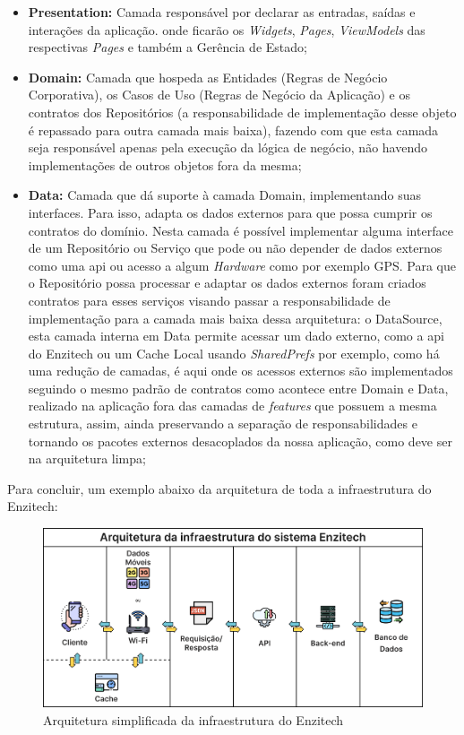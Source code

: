 \begin{itemize}
   \item \textbf{Presentation:} Camada responsável por declarar as entradas, saídas e interações da aplicação. onde ficarão os \textit{Widgets}, \textit{Pages}, \textit{ViewModels} das respectivas \textit{Pages} e também a Gerência de Estado;
   \item \textbf{Domain:} Camada que hospeda as Entidades (Regras de Negócio Corporativa), os Casos de Uso (Regras de Negócio da Aplicação) e os contratos dos Repositórios (a responsabilidade de implementação desse objeto é repassado para outra camada mais baixa), fazendo com que esta camada seja responsável apenas pela execução da lógica de negócio, não havendo implementações de outros objetos fora da mesma;
   \item \textbf{Data:} Camada que dá suporte à camada Domain, implementando suas interfaces. Para isso, adapta os dados externos para que possa cumprir os contratos do domínio. Nesta camada é possível implementar alguma interface de um Repositório ou Serviço que pode ou não depender de dados externos como uma \ac{api} ou acesso a algum \textit{Hardware} como por exemplo GPS. Para que o Repositório possa processar e adaptar os dados externos foram criados contratos para esses serviços visando passar a responsabilidade de implementação para a camada mais baixa dessa arquitetura: o DataSource, esta camada interna em Data permite acessar um dado externo, como a \ac{api} do Enzitech ou um Cache Local usando \textit{SharedPrefs} por exemplo, como há uma redução de camadas, é aqui onde os acessos externos são implementados seguindo o mesmo padrão de contratos como acontece entre Domain e Data, realizado na aplicação fora das camadas de \textit{features} que possuem a mesma estrutura, assim, ainda preservando a separação de responsabilidades e tornando os pacotes externos desacoplados da nossa aplicação, como deve ser na arquitetura limpa;
 \end{itemize}

Para concluir, um exemplo abaixo da arquitetura de toda a infraestrutura do Enzitech:

\begin{figure}[H]
\centering
  \includegraphics[width=\columnwidth]{images/arquitetura_enzitech.png}
  \caption{Arquitetura simplificada da infraestrutura do Enzitech}
  \label{fig:arquitetura_enzitech}
\end{figure}


